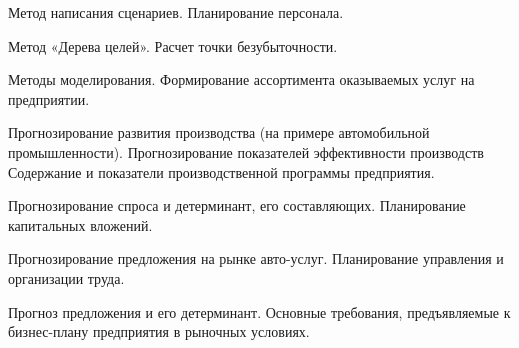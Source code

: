 \documentclass[
	14pt,
	a4paper,
	]
	{scrartcl}
\begin{document}
\vfill

\newpage


\shapk
{}
\setcounter{zad}{0}

\vfill
\z Метод написания сценариев.
 \vfill
\z Планирование персонала.
 \vfill

\vfill

\newpage


\shapk
{}
\setcounter{zad}{0}

\vfill
\z Метод «Дерева целей».
 \vfill
\z Расчет точки безубыточности.
 \vfill

\vfill

\newpage


\shapk
{}
\setcounter{zad}{0}

\vfill
\z Методы моделирования.
 \vfill
\z Формирование ассортимента оказываемых услуг на предприятии.
 \vfill

\vfill

\newpage


\shapk
{}
\setcounter{zad}{0}

\vfill
\z Прогнозирование развития производства (на примере автомобильной промышленности). Прогнозирование показателей эффективности производств
 \vfill
\z Содержание и показатели производственной программы предприятия.
 \vfill

\vfill

\newpage


\shapk
{}
\setcounter{zad}{0}

\vfill
\z Прогнозирование спроса и детерминант, его составляющих.
 \vfill
\z Планирование капитальных вложений.
 \vfill

\vfill

\newpage


\shapk
{}
\setcounter{zad}{0}

\vfill
\z Прогнозирование предложения на рынке авто-услуг.
 \vfill
\z Планирование управления и организации труда.
 \vfill

\vfill

\newpage


\shapk
{}
\setcounter{zad}{0}

\vfill
\z Прогноз предложения и его детерминант.
 \vfill
\z Основные требования, предъявляемые к бизнес-плану предприятия в рыночных условиях.
 \vfill

\vfill
\end{document}
